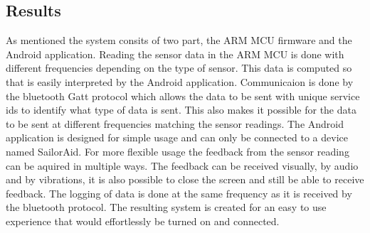 \subsection{Results}
As mentioned the system consits of two part, the ARM MCU firmware and the Android application. Reading the sensor data in the ARM MCU is done with different frequencies depending on the type of sensor. This data is computed so that is easily interpreted by the Android application. Communicaion is done by the bluetooth Gatt protocol which allows the data to be sent with unique service ids to identify what type of data is sent. This also makes it possible for the data to be sent at different frequencies matching the sensor readings. The Android application is designed for simple usage and can only be connected to a device named SailorAid. For more flexible usage the feedback from the sensor reading can be aquired in multiple ways. The feedback can be received visually, by audio and by vibrations, it is also possible to close the screen and still be able to receive feedback. The logging of data is done at the same frequency as it is received by the bluetooth protocol. The resulting system is created for an easy to use experience that would effortlessly be turned on and connected.
